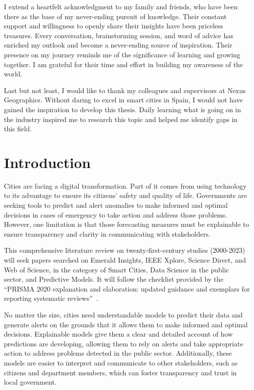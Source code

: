 \documentclass[a4paper,12pt,twoside]{ThesisStyle}
\begin{document}
I extend a heartfelt acknowledgment to my family and friends, who have been there as the base of my never-ending pursuit of knowledge. Their constant support and willingness to openly share their insights have been priceless treasures. Every conversation, brainstorming session, and word of advice has enriched my outlook and become a never-ending source of inspiration. Their presence on my journey reminds me of the significance of learning and growing together. I am grateful for their time and effort in building my awareness of the world. 

Last but not least, I would like to thank my colleagues and supervisors at Nexus Geographics. Without daring to excel in smart cities in Spain, I would not have gained the inspiration to develop this thesis. Daily learning what is going on in the industry inspired me to research this topic and helped me identify gaps in this field.


\tableofcontents

\listoffigures

\listoftables

\mainmatter

\chapter{Introduction}
\label{cap:intro}

Cities are facing a digital transformation. Part of it comes from using technology to its advantage to ensure its citizens' safety and quality of life. Governments are seeking tools to predict and alert anomalies to make informed and optimal decisions in cases of emergency to take action and address those problems. However, one limitation is that those forecasting measures must be explainable to ensure transparency and clarity in communicating with stakeholders.

This comprehensive literature review on twenty-first-century studies (2000-2023) will seek papers searched on Emerald Insights, IEEE Xplore, Science Direct, and Web of Science, in the category of Smart Cities, Data Science in the public sector, and Predictive Models. It will follow the checklist provided by the “PRISMA 2020 explanation and elaboration: updated guidance and exemplars for reporting systematic reviews”~\cite{PRISMA2020}.

No matter the size, cities need understandable models to predict their data and generate alerts on the grounds that it allows them to make informed and optimal decisions. Explainable models give them a clear and detailed account of how predictions are developing, allowing them to rely on alerts and take appropriate action to address problems detected in the public sector. Additionally, these models are easier to interpret and communicate to other stakeholders, such as citizens and department members, which can foster transparency and trust in local government.
\end{document}
